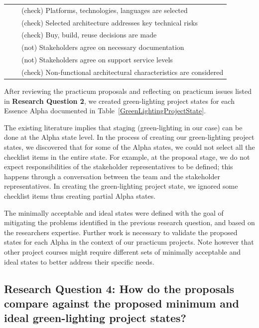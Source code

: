 \documentclass[conference]{IEEEtran}
\begin{document}
\begin{table}
\begin{tabular}{|l|p{2.50in}|p{3.35in}|}
                &                                     & (check) Platforms, technologies, languages are selected \\
                &                                     & (check) Selected architecture addresses key technical risks \\
                &                                     & (check) Buy, build, reuse decisions are made \\
                &                                     & (not) Stakeholders agree on necessary documentation \\
                &                                     & (not) Stakeholders agree on support service levels \\
                &                                     & (check) Non-functional architectural characteristics are considered \\ \hline
\end{tabular}
\end{table}

After reviewing the practicum proposals and reflecting on practicum
issues listed in \textbf{Research Question 2}, we created green-lighting project
states for each Essence Alpha documented in Table~\ref{GreenLightingProjectState}.

The existing literature \cite{EssenceBook} implies
that staging (green-lighting in our case) can be done at the Alpha state level. In the process of creating our green-lighting project states, we discovered that for some of the Alpha states, we could not select all the checklist items in the entire state. For example, at the proposal stage, we do not expect responsibilities of the stakeholder representatives to be defined; this happens through a conversation between the team and the stakeholder representatives. In creating the green-lighting project state, we ignored some checklist items thus creating partial Alpha states.

The minimally acceptable and ideal states were defined with the goal of mitigating the problems identified in the previous research question, and based on the researchers expertise. Further work is necessary to validate the proposed states for each Alpha in the context of our practicum projects. Note however that other project courses might require different sets of minimally acceptable and ideal states to better address their specific needs.

\subsection{Research Question 4: How do the proposals
compare against the proposed minimum and ideal green-lighting project
states?}
\end{document}
